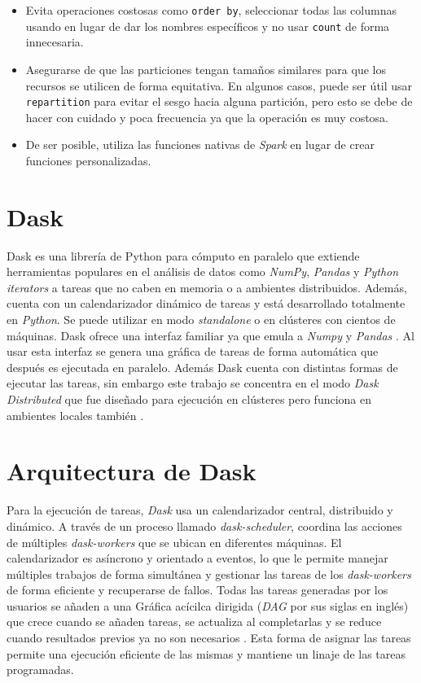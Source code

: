 \begin{itemize}
	\item Evita operaciones costosas como \texttt{order by}, seleccionar todas las columnas usando \texttt{\*} en lugar de dar los nombres específicos y no usar \texttt{count} de forma innecesaria.
	\item Asegurarse de que las particiones tengan tamaños similares para que los recursos se utilicen de forma equitativa. En algunos casos, puede ser útil usar \texttt{repartition} para evitar el sesgo hacia alguna partición, pero esto se debe de hacer con cuidado y poca frecuencia ya que la operación es muy costosa.
	\item De ser posible, utiliza las funciones nativas de \textit{Spark} en lugar de crear funciones personalizadas.
	 	
\end{itemize}

\section{Dask}

Dask es una librería de Python para cómputo en paralelo que extiende herramientas populares en el análisis de datos como \textit{NumPy}, \textit{Pandas} y \textit{Python iterators} a tareas que no caben en memoria o a ambientes distribuidos. Además, cuenta con un calendarizador dinámico de tareas y está desarrollado totalmente en \textit{Python}. Se puede utilizar en modo \textit{standalone} o en clústeres con cientos de máquinas. Dask ofrece una interfaz familiar ya que emula a \textit{Numpy} y \textit{Pandas} \cite{daskdocs}. Al usar esta interfaz se genera una gráfica de tareas de forma automática que después es ejecutada en paralelo. Además Dask cuenta con distintas formas de ejecutar las tareas, sin embargo este trabajo se concentra en el modo \textit{Dask Distributed} que fue diseñado para ejecución en clústeres pero funciona en ambientes locales también \cite{daskscheduling}.

\section{Arquitectura de Dask}

Para la ejecución de tareas, \textit{Dask} usa un calendarizador central, distribuido y dinámico. A través de un proceso llamado \textit{dask-scheduler}, coordina las acciones de múltiples \textit{dask-workers} que se ubican en diferentes máquinas. El calendarizador es asíncrono y orientado a eventos, lo que le permite manejar múltiples trabajos de forma simultánea y gestionar las tareas de los \textit{dask-workers} de forma eficiente y recuperarse de fallos. Todas las tareas generadas por los usuarios se añaden a una Gráfica acícilca dirigida (\textit{DAG} por sus siglas en inglés) que crece cuando se añaden tareas, se actualiza al completarlas y se reduce cuando resultados previos ya no son necesarios \cite{daskdistributed}. Esta forma de asignar las tareas permite una ejecución eficiente de las mismas y mantiene un linaje de las tareas programadas.


